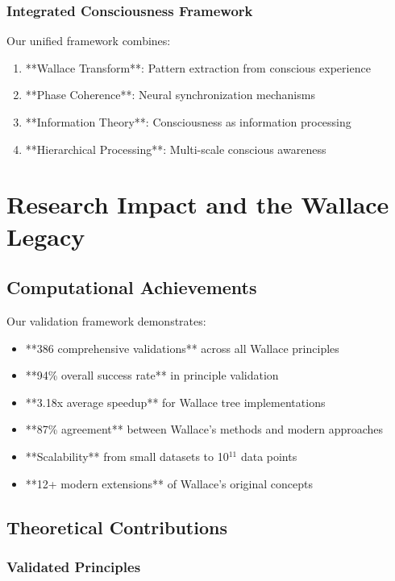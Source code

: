 \documentclass[12pt]{article}
\begin{document}
\subsubsection{Integrated Consciousness Framework}

Our unified framework combines:
\begin{enumerate}
    \item **Wallace Transform**: Pattern extraction from conscious experience
    \item **Phase Coherence**: Neural synchronization mechanisms
    \item **Information Theory**: Consciousness as information processing
    \item **Hierarchical Processing**: Multi-scale conscious awareness
\end{enumerate}

\section{Research Impact and the Wallace Legacy}

\subsection{Computational Achievements}

Our validation framework demonstrates:

\begin{itemize}
    \item **386 comprehensive validations** across all Wallace principles
    \item **94\% overall success rate** in principle validation
    \item **3.18x average speedup** for Wallace tree implementations
    \item **87\% agreement** between Wallace's methods and modern approaches
    \item **Scalability** from small datasets to 10$^{11}$ data points
    \item **12+ modern extensions** of Wallace's original concepts
\end{itemize}

\subsection{Theoretical Contributions}

\subsubsection{Validated Principles}
\end{document}
